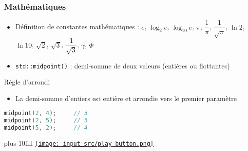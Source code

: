 \documentclass[C++.tex]{subfiles}
\begin{document}
\begin{frame}[fragile]
	\frametitle{Mathématiques}
	\begin{itemize}
		\item Définition de constantes mathématiques : $e$, $\log_2 e$, $\log_{10} e$, $\pi$, $\dfrac{1}{\pi}$, $\dfrac{1}{\sqrt{\pi}}$, $\ln{2}$, $\ln{10}$, $\sqrt{2}$, $\sqrt{3}$, $\dfrac{1}{\sqrt{3}}$, $\gamma$, $\Phi$


		\item \lstinline|std::midpoint()| : demi-somme de deux valeurs (entières ou flottantes)
	\end{itemize}

	\begin{block}{Règle d'arrondi}
		\begin{itemize}
			\item La demi-somme d'entiers est entière et arrondie vers le premier paramètre
		\end{itemize}

		\begin{lstlisting}[language=C++]
midpoint(2, 4);     // 3
midpoint(2, 5);     // 3
midpoint(5, 2);     // 4\end{lstlisting}
	\end{block}

	\vskip 10mm plus 10fill
	\hfill
	\href{https://godbolt.org/#g:!((g:!((g:!((h:codeEditor,i:(filename:'1',fontScale:14,fontUsePx:'0',j:1,lang:c%2B%2B,selection:(endColumn:1,endLineNumber:10,positionColumn:1,positionLineNumber:10,selectionStartColumn:1,selectionStartLineNumber:1,startColumn:1,startLineNumber:1),source:'%23include+%3Ciostream%3E%0A%23include+%3Cnumeric%3E%0A%0Aint+main()%0A%7B%0A++std::cout+%3C%3C+std::midpoint(2,+4)+%3C%3C+%22%5Cn%22%3B%0A++std::cout+%3C%3C+std::midpoint(2,+5)+%3C%3C+%22%5Cn%22%3B%0A++std::cout+%3C%3C+std::midpoint(5,+2)+%3C%3C+%22%5Cn%22%3B+%0A%7D%0A'),l:'5',n:'0',o:'C%2B%2B+source+%231',t:'0')),k:50,l:'4',n:'0',o:'',s:0,t:'0'),(g:!((h:executor,i:(argsPanelShown:'1',compilationPanelShown:'0',compiler:g122,compilerName:'',compilerOutShown:'0',execArgs:'',execStdin:'',fontScale:14,fontUsePx:'0',j:1,lang:c%2B%2B,libs:!((name:boost,ver:'175')),options:'-std%3Dc%2B%2B20+-Wall+-Wextra+-pedantic',source:1,stdinPanelShown:'1',tree:'1',wrap:'0'),l:'5',n:'0',o:'Executor+x86-64+gcc+12.2+(C%2B%2B,+Editor+%231)',t:'0')),header:(),k:50,l:'4',n:'0',o:'',s:0,t:'0')),l:'2',n:'0',o:'',t:'0')),version:4}{\texttt{[image: input\_src/play-button.png]}}
\end{frame}
\end{document}
